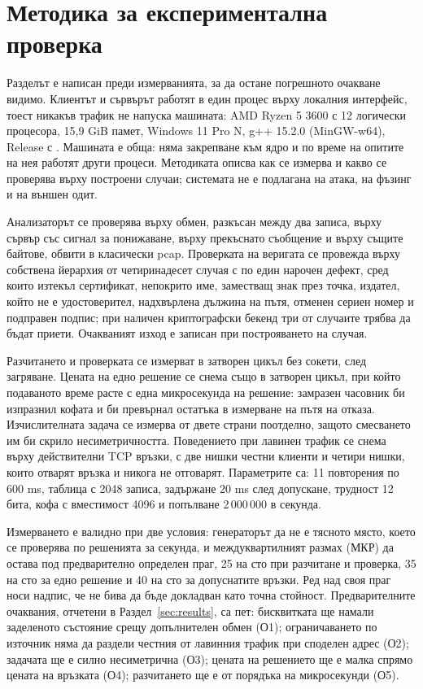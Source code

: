 \section{Методика за експериментална проверка}
\label{sec:method}

Разделът е написан преди измерванията, за да остане погрешното очакване видимо. Клиентът и
сървърът работят в един процес върху локалния интерфейс, тоест никакъв трафик не напуска
машината: AMD Ryzen 5 3600 с 12 логически процесора, 15,9 GiB памет, Windows 11 Pro N, g++ 15.2.0
(MinGW-w64), Release с . Машината е обща: няма закрепване към ядро и по време
на опитите на нея работят други процеси. Методиката описва как се измерва и какво се проверява
върху построени случаи; системата не е подлагана на атака, на фъзинг и на външен одит.

Анализаторът се проверява върху обмен, разкъсан между два записа, върху сървър със сигнал за
понижаване, върху прекъснато съобщение и върху същите байтове, обвити в класически pcap.
Проверката на веригата се провежда върху собствена
йерархия от четиринадесет случая с по един нарочен дефект, сред които изтекъл сертификат, непокрито
име, заместващ знак през точка, издател, който не е удостоверител, надхвърлена дължина на пътя,
отменен сериен номер и подправен подпис; при наличен криптографски бекенд три от случаите трябва
да бъдат приети. Очакваният изход е записан при построяването на случая.

Разчитането и проверката се измерват в затворен цикъл без сокети, след загряване. Цената на едно
решение се снема също в затворен цикъл, при който подаваното време расте с една микросекунда на
решение: замразен часовник би изпразнил кофата и би превърнал остатъка в измерване на пътя на
отказа. Изчислителната задача се измерва от двете страни поотделно, защото
смесването им би скрило несиметричността. Поведението при лавинен трафик се снема върху
действителни TCP връзки, с две нишки честни клиенти и четири нишки, които отварят връзка и никога
не отговарят. Параметрите са: 11 повторения по 600 ms, таблица с 2048 записа, задържане 20 ms след
допускане, трудност 12 бита, кофа с вместимост 4096 и попълване 2\,000\,000 в секунда.

Измерването е валидно при две условия: генераторът да не е тясното място, което се проверява по
решенията за секунда, и междуквартилният размах (МКР) да остава под предварително определен праг,
25 на сто при разчитане и проверка, 35 на сто за едно решение и 40 на сто за допуснатите връзки.
Ред над своя праг носи надпис, че не бива да бъде докладван като точна стойност. Предварителните
очаквания, отчетени в Раздел~\ref{sec:results}, са пет: бисквитката ще намали заделеното
състояние срещу допълнителен обмен (О1); ограничаването по източник няма да раздели честния от
лавинния трафик при споделен адрес (О2); задачата ще е силно несиметрична (О3); цената на
решението ще е малка спрямо цената на връзката (О4); разчитането ще е от порядъка на микросекунди
(О5).
